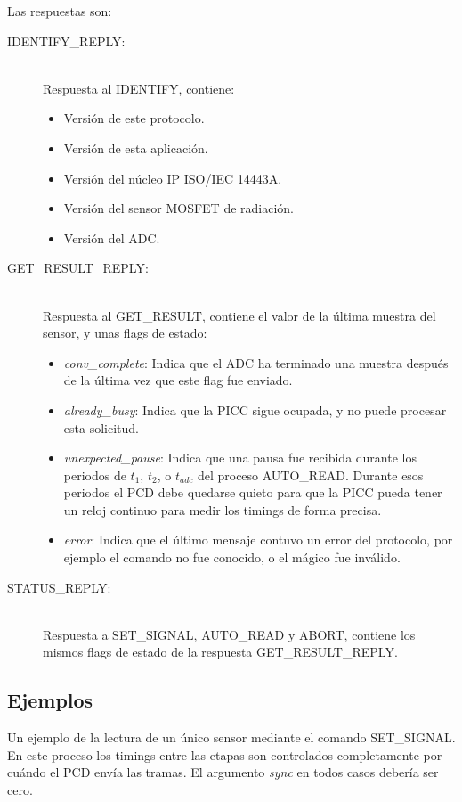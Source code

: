 \documentclass[a4paper, twoside, 11pt]{report}
\begin{document}
Las respuestas son:

\begin{description}
  \item [IDENTIFY\_REPLY:] \hfill \\ Respuesta al IDENTIFY, contiene:
  \begin{itemize}
    \item Versión de este protocolo.
    \item Versión de esta aplicación.
    \item Versión del núcleo IP ISO/IEC 14443A.
    \item Versión del sensor MOSFET de radiación.
    \item Versión del ADC.
  \end{itemize}
  \item [GET\_RESULT\_REPLY:] \hfill \\ Respuesta al GET\_RESULT, contiene el valor de la última muestra del sensor, y unas flags de estado:
  \begin{itemize}
    \item \textit{conv\_complete}: Indica que el ADC ha terminado una muestra después de la última vez que este flag fue enviado.
    \item \textit{already\_busy}: Indica que la PICC sigue ocupada, y no puede procesar esta solicitud.
    \item \textit{unexpected\_pause}: Indica que una pausa fue recibida durante los periodos de $t_1$, $t_2$, o $t_{adc}$ del proceso AUTO\_READ. Durante esos periodos el PCD debe quedarse quieto para que la PICC pueda tener un reloj continuo para medir los timings de forma precisa.
    \item \textit{error}: Indica que el último mensaje contuvo un error del protocolo, por ejemplo el comando no fue conocido, o el mágico fue inválido.
  \end{itemize}
  \item [STATUS\_REPLY:] \hfill \\ Respuesta a SET\_SIGNAL, AUTO\_READ y ABORT, contiene los mismos flags de estado de la respuesta GET\_RESULT\_REPLY.
\end{description}

\FloatBarrier
\subsection{Ejemplos}

Un ejemplo de la lectura de un único sensor mediante el comando SET\_SIGNAL. En este proceso los timings entre las etapas son controlados completamente por cuándo el PCD envía las tramas. El argumento \textit{sync} en todos casos debería ser cero.
\end{document}
